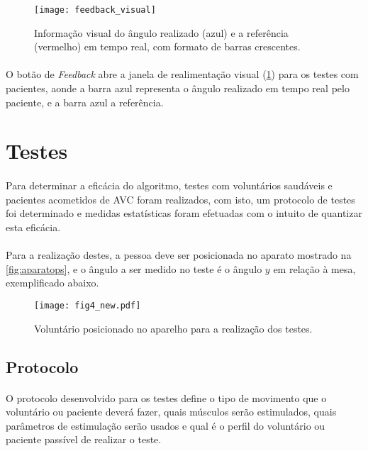 \begin{figure}[H]
	\centering
	\texttt{[image: feedback\_visual]}
	\caption{Informação visual do ângulo realizado (azul) e a referência (vermelho) em tempo real, com formato de barras crescentes.}
	\label{fig:feedback_visual}
\end{figure}

\paragraph{}O botão de \textit{Feedback} abre a janela de realimentação visual (\ref{fig:feedback_visual}) para os testes com pacientes, aonde a barra azul representa o ângulo realizado em tempo real pelo paciente, e a barra azul a referência.

\section{Testes}
\paragraph{}Para determinar a eficácia do algoritmo, testes com voluntários saudáveis e pacientes acometidos de AVC foram realizados, com isto, um protocolo de testes foi determinado e medidas estatísticas foram efetuadas com o intuito de quantizar esta eficácia.

\paragraph{}Para a realização destes, a pessoa deve ser posicionada no aparato mostrado na \ref{fig:aparatops}, e o ângulo a ser medido no teste é o ângulo $y$ em relação à mesa, exemplificado abaixo.

\begin{figure}[H]
	\centering
	\texttt{[image: fig4\_new.pdf]}
	\caption{Voluntário posicionado no aparelho para a realização dos testes.}
	\label{fig:thiago_anguloy}
\end{figure}


\subsection{Protocolo}
\paragraph{}O protocolo desenvolvido para os testes define o tipo de movimento que o voluntário ou paciente deverá fazer, quais músculos serão estimulados, quais parâmetros de estimulação serão usados e qual é o perfil do voluntário ou paciente passível de realizar o teste.

